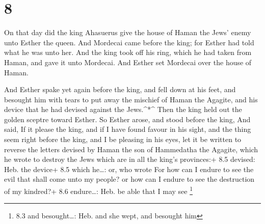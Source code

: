 \hypertarget{section-7}{%
\section{8}\label{section-7}}

 On that day did the king Ahasuerus give the house of Haman
the Jews' enemy unto Esther the queen. And Mordecai came before the
king; for Esther had told what he was unto her.  And the
king took off his ring, which he had taken from Haman, and gave it unto
Mordecai. And Esther set Mordecai over the house of Haman.

 And Esther spake yet again before the king, and fell down
at his feet, and besought him with tears to put away the mischief of
Haman the Agagite, and his device that he had devised against the
Jews.\^{}*\^{}  Then the king held out the golden sceptre
toward Esther. So Esther arose, and stood before the king, 
And said, If it please the king, and if I have found favour in his
sight, and the thing seem right before the king, and I be pleasing in
his eyes, let it be written to reverse the letters devised by Haman the
son of Hammedatha the Agagite, which he wrote to destroy the Jews which
are in all the king's provinces:+ 8.5 devised: Heb. the device+ 8.5
which he\ldots: or, who wrote  For how can I endure to see
the evil that shall come unto my people? or how can I endure to see the
destruction of my kindred?+ 8.6 endure\ldots: Heb. be able that I may
see \footnote{8.3 and besought\ldots: Heb. and she wept, and besought
  him}

